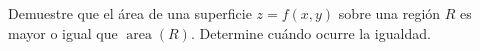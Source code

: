 Demuestre que el área de una superficie $z=f(x,y)$ sobre una región $R$ es mayor o igual que $\operatorname{area}(R)$. Determine cuándo ocurre la igualdad.
